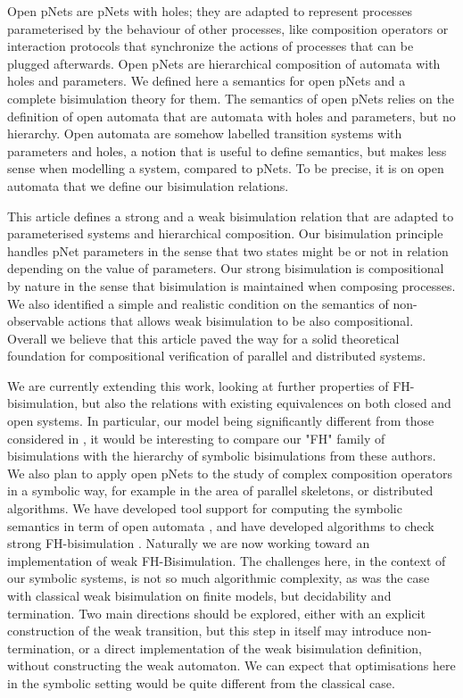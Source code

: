 \documentclass{lmcs}
\begin{document}
Open pNets are pNets with holes; they are adapted to represent processes parameterised by the behaviour of other processes, like composition operators or interaction 
protocols that synchronize the actions of processes that can be plugged afterwards. Open
pNets are hierarchical composition of automata with holes and parameters. We
defined here a semantics for open pNets and a complete bisimulation theory for them. 
The semantics of open pNets relies on the definition of open automata that are automata with holes and parameters, but no hierarchy. Open automata are somehow labelled transition systems with parameters and holes, a notion that is useful to define semantics, but makes less sense when modelling a system, compared to pNets. To be precise, it is on open automata that we define our bisimulation relations.

This article defines a strong and a weak bisimulation relation that are adapted to parameterised systems and hierarchical composition. Our bisimulation principle handles pNet parameters in the sense that two states might be or not in relation depending on the value of parameters. Our strong  bisimulation is compositional by nature in the sense that bisimulation is maintained when composing processes. We also identified a simple and realistic condition on the semantics of non-observable actions that allows weak bisimulation to be also compositional. Overall we believe that this article paved the way for a solid theoretical foundation for compositional verification of parallel and distributed systems.


We are currently extending this work,  looking at further properties of FH-bisimulation, but also
the relations with existing equivalences on both closed and open systems. In particular, our model being significantly different from those considered in \cite{IngolfsdottirL:2001}, it
would be interesting to compare our "FH" family of bisimulations with the hierarchy of symbolic bisimulations from these authors.
We also plan to apply open pNets to the study of complex composition
operators in a symbolic way, for example in the area of parallel
skeletons, or distributed algorithms.
We have developed tool support for computing the
symbolic semantics in term of open automata \cite{QBMZ-AVOCS18}, and have
developed algorithms to check strong FH-bisimulation \cite{hou:hal-02406098}.  
Naturally we are now working toward an implementation of weak FH-Bisimulation. 
The challenges here, in the context of our symbolic systems, is not so much algorithmic complexity,
as was the case with classical weak bisimulation on finite models, but decidability and termination.
Two main directions should be explored, either with an explicit construction of the weak transition, but this step in
itself may introduce non-termination, or a direct implementation of the weak bisimulation definition, without
constructing the weak automaton. We can expect that optimisations here in the symbolic setting would be quite different from the classical case.
\end{document}
